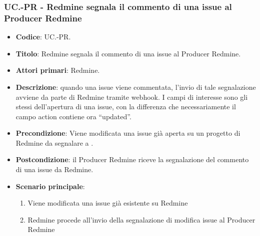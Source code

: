 \subsubsection{UC\theuccount.\thesubuccount-PR - Redmine segnala il commento di una issue al Producer Redmine}
\begin{itemize}
	\item \textbf{Codice}: UC\theuccount.\thesubuccount-PR.
	\item \textbf{Titolo}: Redmine segnala il commento di una issue al Producer Redmine.
	\item \textbf{Attori primari}: Redmine.
	\item \textbf{Descrizione}: quando una issue viene commentata, l'invio di tale segnalazione
	avviene da parte di Redmine tramite webhook.
	I campi di interesse sono gli stessi dell'apertura di una issue, con la differenza che necessariamente il campo action contiene ora ``updated''.
	\item \textbf{Precondizione}: Viene modificata una issue già aperta su un
	progetto di Redmine da segnalare a \progetto.
	\item \textbf{Postcondizione}: il Producer Redmine riceve la segnalazione del commento di una issue da Redmine.
	\item \textbf{Scenario principale}:
	\begin{enumerate}
		\item Viene modificata una issue già esistente su Redmine
		\item Redmine procede all'invio della segnalazione di modifica issue al Producer Redmine
	\end{enumerate}

\end{itemize}
